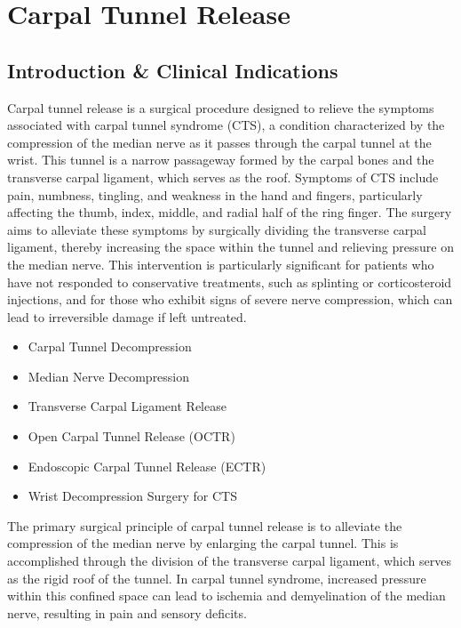 \chapter{Carpal Tunnel Release}

\section*{Introduction \& Clinical Indications}
Carpal tunnel release is a surgical procedure designed to relieve the symptoms associated with carpal tunnel syndrome (CTS), a condition characterized by the compression of the median nerve as it passes through the carpal tunnel at the wrist. This tunnel is a narrow passageway formed by the carpal bones and the transverse carpal ligament, which serves as the roof. Symptoms of CTS include pain, numbness, tingling, and weakness in the hand and fingers, particularly affecting the thumb, index, middle, and radial half of the ring finger. The surgery aims to alleviate these symptoms by surgically dividing the transverse carpal ligament, thereby increasing the space within the tunnel and relieving pressure on the median nerve. This intervention is particularly significant for patients who have not responded to conservative treatments, such as splinting or corticosteroid injections, and for those who exhibit signs of severe nerve compression, which can lead to irreversible damage if left untreated.

\begin{itemize}
  \item Carpal Tunnel Decompression
  \item Median Nerve Decompression
  \item Transverse Carpal Ligament Release
  \item Open Carpal Tunnel Release (OCTR)
  \item Endoscopic Carpal Tunnel Release (ECTR)
  \item Wrist Decompression Surgery for CTS
\end{itemize}

The primary surgical principle of carpal tunnel release is to alleviate the compression of the median nerve by enlarging the carpal tunnel. This is accomplished through the division of the transverse carpal ligament, which serves as the rigid roof of the tunnel. In carpal tunnel syndrome, increased pressure within this confined space can lead to ischemia and demyelination of the median nerve, resulting in pain and sensory deficits. 

